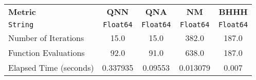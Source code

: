 \begin{tabular}{lcccc}
  \hline
  \textbf{Metric} & \textbf{QNN} & \textbf{QNA} & \textbf{NM} & \textbf{BHHH} \\
  \texttt{String} & \texttt{Float64} & \texttt{Float64} & \texttt{Float64} & \texttt{Float64} \\\hline
  Number of Iterations & 15.0 & 15.0 & 382.0 & 187.0 \\
  Function Evaluations & 92.0 & 91.0 & 638.0 & 187.0 \\
  Elapsed Time (seconds) & 0.337935 & 0.09553 & 0.013079 & 0.007 \\\hline
\end{tabular}
